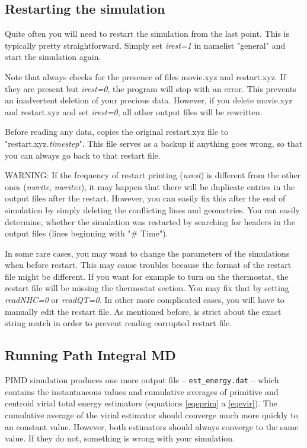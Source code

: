 \subsection{Restarting the simulation}

Quite often you will need to restart the simulation from the last point. This is typically pretty straightforward. Simply set \textit{irest=1} in namelist "general" and start the simulation again. 

Note that \abin always checks for the presence of files movie.xyz and restart.xyz. If they are present but \textit{irest=0}, the program will stop with an error. This prevents an inadvertent deletion of your precious data. However, if you delete movie.xyz and restart.xyz and set \textit{irest=0}, all other output files will be rewritten. 

Before reading any data, \abin copies the original restart.xyz file to "restart.xyz.\textit{timestep}". This file serves as a backup if anything goes wrong, so that you can always go back to that restart file. 

\medskip
WARNING: If the frequency of restart printing (\textit{nrest}) is different from the other ones (\textit{nwrite}, \textit{nwritex}), it may happen that there will be duplicate entries in the output files after the restart. However, you can easily fix this after the end of simulation by simply deleting the conflicting lines and geometries. You can easily determine, whether the simulation was restarted by searching for headers in the output files (lines beginning with "\# Time").

\medskip
In some rare cases, you may want to change the parameters of the simulations when before restart.
This may cause troubles because the format of the restart file might be different. If you want for example to turn on the thermostat, the restart file will be missing the thermostat section. You may fix that by setting \textit{readNHC=0} or \textit{readQT=0}. In other more complicated cases, you will have to manually edit the restart file. As mentioned before, \abin is strict about the exact string match in order to prevent reading corrupted restart file.  

\subsection{Running Path Integral MD}

PIMD simulation produces one more output file -- \texttt{est\_energy.dat} -- which contains the instantaneous values and cumulative averages of primitive and centroid virial total energy estimators (equations \ref{eqeprim} a \ref{eqevir}). The cumulative average of the virial estimator should converge much more quickly to an constant value. However, both estimators should always converge to the same value. If they do not, something is wrong with your simulation.

